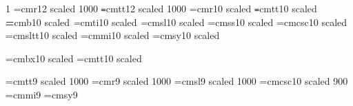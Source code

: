 \begin{\parsearg\beginxxx}


\newfam\sffam
\def\sf{\fam=\sffam \tensf}
\let\li = \sf %

\def\ttsl{\tenttsl}

\let\mainmagstep=\magstephalf

\def\setfont#1#2#3#4{\font#1=\fontprefix#2#3 scaled #4}

\ifx\fontprefix\undefined
\def\fontprefix{cm}
\fi
\def\rmshape{r}
\def\rmbshape{bx}		%
\def\bfshape{b}
\def\bxshape{bx}
\def\ttshape{tt}
\def\ttbshape{tt}
\def\ttslshape{sltt}
\def\itshape{ti}
\def\itbshape{bxti}
\def\slshape{sl}
\def\slbshape{bxsl}
\def\sfshape{ss}
\def\sfbshape{ss}
\def\scshape{csc}
\def\scbshape{csc}

\ifx\bigger\relax
\let\mainmagstep=\magstep1
\setfont\textrm\rmshape{12}{1000}
\setfont\texttt\ttshape{12}{1000}
\else
\setfont\textrm\rmshape{10}{\mainmagstep}
\setfont\texttt\ttshape{10}{\mainmagstep}
\fi
\setfont\textbf\bfshape{10}{\mainmagstep}
\setfont\textit\itshape{10}{\mainmagstep}
\setfont\textsl\slshape{10}{\mainmagstep}
\setfont\textsf\sfshape{10}{\mainmagstep}
\setfont\textsc\scshape{10}{\mainmagstep}
\setfont\textttsl\ttslshape{10}{\mainmagstep}
\font\texti=cmmi10 scaled \mainmagstep
\font\textsy=cmsy10 scaled \mainmagstep

\setfont{}\bxshape{10}{} %
\setfont{}\ttshape{10}{}
\def\df{\let\tentt=\deftt \let\tenbf = \defbf \bf}

\setfont\ninett\ttshape{9}{1000}
\setfont\indrm\rmshape{9}{1000}
\setfont\indit\slshape{9}{1000}
\let\indsl=\indit
\let\indtt=\ninett
\let\indttsl=\ninett
\let\indsf=\indrm
\let\indbf=\indrm
\setfont\indsc\scshape{10}{900}
\font\indi=cmmi9
\font\indsy=cmsy9


\end{\parsearg\beginxxx}
